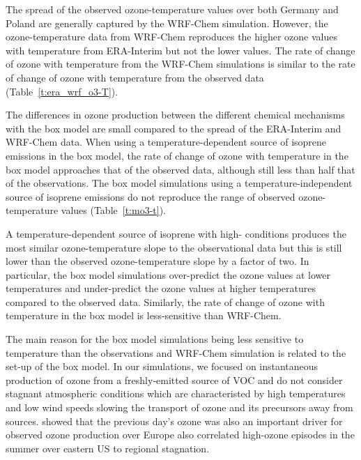 The spread of the observed ozone-temperature values over both Germany and Poland are generally captured by the WRF-Chem simulation.
However, the ozone-temperature data from WRF-Chem reproduces the higher ozone values with temperature from ERA-Interim but not the lower values.
The rate of change of ozone with temperature from the WRF-Chem simulations is similar to the rate of change of ozone with temperature from the observed data (Table~\ref{t:era_wrf_o3-T}).

The differences in ozone production between the different chemical mechanisms with the box model are small compared to the spread of the ERA-Interim and WRF-Chem data.
When using a temperature-dependent source of isoprene emissions in the box model, the rate of change of ozone with temperature in the box model approaches that of the observed data, although still less than half that of the observations.
The box model simulations using a temperature-independent source of isoprene emissions do not reproduce the range of observed ozone-temperature values (Table~\ref{t:mo3-t}).

A temperature-dependent source of isoprene with high- conditions produces the most similar ozone-temperature slope to the observational data but this is still lower than the observed ozone-temperature slope by a factor of two.
In particular, the box model simulations over-predict the ozone values at lower temperatures and under-predict the ozone values at higher temperatures compared to the observed data.
Similarly, the rate of change of ozone with temperature in the box model is less-sensitive than WRF-Chem.

The main reason for the box model simulations being less sensitive to temperature than the observations and WRF-Chem simulation is related to the set-up of the box model.
In our simulations, we focused on instantaneous production of ozone from a freshly-emitted source of VOC and do not consider stagnant atmospheric conditions which are characteristed by high temperatures and low wind speeds slowing the transport of ozone and its precursors away from sources.
\citet{Otero:2016} showed that the previous day's ozone was also an important driver for observed ozone production over Europe also \citet{Jacob:1993} correlated high-ozone episodes in the summer over eastern US to regional stagnation.

